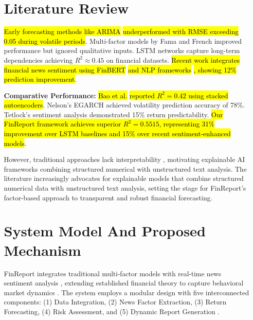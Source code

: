 \documentclass[3p,times,procedia]{elsarticle}
\begin{document}
\section{Literature Review}
\vspace{-3pt}
\hl{Early forecasting methods like ARIMA} \cite{Box1970} \hl{underperformed with RMSE exceeding 0.05 during volatile periods}. Multi-factor models by Fama and French \cite{FAMA1993} improved performance but ignored qualitative inputs. LSTM networks \cite{Fischer2018} capture long-term dependencies achieving $R^2 \approx 0.45$ on financial datasets. \hl{Recent work integrates financial news sentiment using FinBERT} \cite{Araci2019} \hl{and NLP frameworks} \cite{Loughran2011}\hl{, showing 12\% prediction improvement}.

\textbf{Comparative Performance:} \hl{Bao et al.} \cite{Bao2017} \hl{reported $R^2 = 0.42$ using stacked autoencoders}. Nelson's EGARCH \cite{Nelson1991} achieved volatility prediction accuracy of 78\%. Tetlock's sentiment analysis \cite{TETLOCK2007} demonstrated 15\% return predictability. \hl{Our FinReport framework achieves superior $R^2 = 0.5515$, representing 31\% improvement over LSTM baselines and 15\% over recent sentiment-enhanced models}.

However, traditional approaches lack interpretability \cite{Ribeiro2016}, motivating explainable AI frameworks combining structured numerical with unstructured text analysis. The literature increasingly advocates for explainable models that combine structured numerical data with unstructured text analysis, setting the stage for FinReport's factor-based approach to transparent and robust financial forecasting.

\section{System Model And Proposed Mechanism}
\vspace{-3pt}
FinReport integrates traditional multi-factor models \cite{FAMA1993,Carhart1997} with real-time news sentiment analysis \cite{TETLOCK2007}, extending established financial theory to capture behavioral market dynamics \cite{Daniel1998}. The system employs a modular design with five interconnected components: (1) Data Integration, (2) News Factor Extraction, (3) Return Forecasting, (4) Risk Assessment, and (5) Dynamic Report Generation \cite{Fischer2018}.
\end{document}
